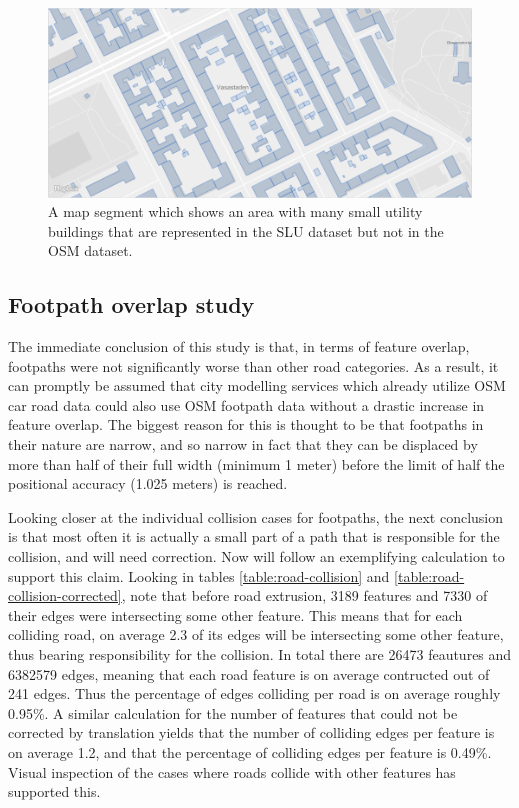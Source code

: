 \documentclass{kththesis}
\begin{document}
\begin{figure}[H]
    \centering
    \includegraphics[width=\textwidth,height=0.5\textheight,keepaspectratio]{img_map_utility_buildings}
    \caption{A map segment which shows an area with many small utility buildings that are represented in the SLU dataset but not in the OSM dataset.}
    \label{fig:osm-slu-map-utility-buildings}
\end{figure}


\subsection{Footpath overlap study}

The immediate conclusion of this study is that, in terms of feature overlap, footpaths were not significantly worse than other road categories.
As a result, it can promptly be assumed that city modelling services which already utilize OSM car road data could also use OSM footpath data without a drastic increase in feature overlap.
The biggest reason for this is thought to be that footpaths in their nature are narrow, and so narrow in fact that they can be displaced by more than half of their full width (minimum 1 meter) before the limit of half the positional accuracy (1.025 meters) is reached.

Looking closer at the individual collision cases for footpaths, the next conclusion is that most often it is actually a small part of a path that is responsible for the collision, and will need correction.
Now will follow an exemplifying calculation to support this claim.
Looking in tables \ref{table:road-collision} and \ref{table:road-collision-corrected}, note that before road extrusion, 3189 features and 7330 of their edges were intersecting some other feature.
This means that for each colliding road, on average 2.3 of its edges will be intersecting some other feature, thus bearing responsibility for the collision.
In total there are 26473 feautures and 6382579 edges, meaning that each road feature is on average contructed out of 241 edges.
Thus the percentage of edges colliding per road is on average roughly 0.95\%.
A similar calculation for the number of features that could not be corrected by translation yields that the number of colliding edges per feature is on average 1.2, and that the percentage of colliding edges per feature is 0.49\%.
Visual inspection of the cases where roads collide with other features has supported this.
\end{document}
